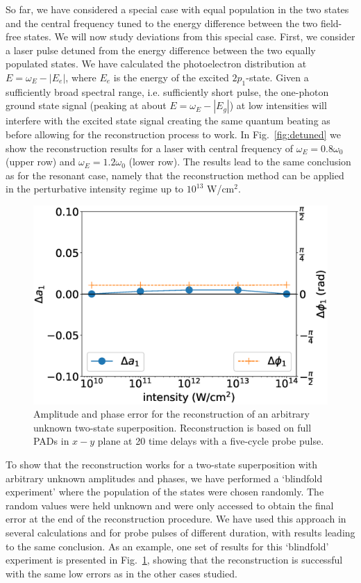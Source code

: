 So far, we have considered a special case with equal population in the two states and the central frequency tuned to the energy difference between the two field-free states. We will now study deviations from this special case. First, we consider a laser pulse detuned from the energy difference between the two equally populated states. We have calculated the photoelectron distribution at $E=\omega_E-|E_e|$, where $E_e$ is the energy of the excited $2p_1$-state. Given a sufficiently broad spectral range, i.e. sufficiently short pulse, the one-photon ground state signal (peaking at about $E = \omega_E-|E_g|$) at low intensities will interfere with the excited state signal creating the same quantum beating as before allowing for the reconstruction process to work. In Fig.~\ref{fig:detuned} we show the reconstruction results for a laser with central frequency of $\omega_E = 0.8\omega_0$ (upper row) and $\omega_E = 1.2\omega_0$ (lower row). 
The results lead to the same conclusion as for the resonant case, namely that the reconstruction method can be applied in the perturbative intensity regime up to $10^{13}$ W/cm$^2$.

\begin{figure}[!ht]
\centering
\includegraphics[width=0.5\linewidth]{figs/Photo_ionization/superpositions/Venzke_new_fig_7.eps}
\caption{
Amplitude and phase error for the reconstruction of an arbitrary unknown two-state superposition. Reconstruction is based on full PADs in $x-y$ plane at 20 time delays with a five-cycle probe pulse. 
} 
  \label{fig:random_state}
\end{figure}

To show that the reconstruction works for a two-state superposition with arbitrary unknown amplitudes and phases, we have performed a `blindfold experiment' where the population of the states were chosen randomly. The random values were held unknown and were only accessed to obtain the final error at the end of the reconstruction procedure. We have used this approach in several calculations and for probe pulses of different duration, with results
leading to the same conclusion. As an example, one set of results for this `blindfold' experiment is presented in Fig.~\ref{fig:random_state}, showing that the reconstruction is successful with the same low errors as in the other cases studied.


